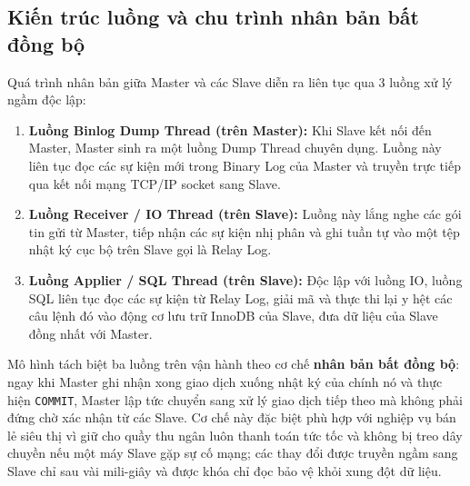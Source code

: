 \documentclass[12pt,a4paper]{report}
\begin{document}
\subsection{Kiến trúc luồng và chu trình nhân bản bất đồng bộ}
Quá trình nhân bản giữa Master và các Slave diễn ra liên tục qua 3 luồng xử lý ngầm độc lập:
\begin{enumerate}
    \item \textbf{Luồng Binlog Dump Thread (trên Master):} Khi Slave kết nối đến Master, Master sinh ra một luồng Dump Thread chuyên dụng. Luồng này liên tục đọc các sự kiện mới trong Binary Log của Master và truyền trực tiếp qua kết nối mạng TCP/IP socket sang Slave.
    \item \textbf{Luồng Receiver / IO Thread (trên Slave):} Luồng này lắng nghe các gói tin gửi từ Master, tiếp nhận các sự kiện nhị phân và ghi tuần tự vào một tệp nhật ký cục bộ trên Slave gọi là Relay Log.
    \item \textbf{Luồng Applier / SQL Thread (trên Slave):} Độc lập với luồng IO, luồng SQL liên tục đọc các sự kiện từ Relay Log, giải mã và thực thi lại y hệt các câu lệnh đó vào động cơ lưu trữ InnoDB của Slave, đưa dữ liệu của Slave đồng nhất với Master.
\end{enumerate}

Mô hình tách biệt ba luồng trên vận hành theo cơ chế \textbf{nhân bản bất đồng bộ}: ngay khi Master ghi nhận xong giao dịch xuống nhật ký của chính nó và thực hiện \texttt{COMMIT}, Master lập tức chuyển sang xử lý giao dịch tiếp theo mà không phải đứng chờ xác nhận từ các Slave. Cơ chế này đặc biệt phù hợp với nghiệp vụ bán lẻ siêu thị vì giữ cho quầy thu ngân luôn thanh toán tức tốc và không bị treo dây chuyền nếu một máy Slave gặp sự cố mạng; các thay đổi được truyền ngầm sang Slave chỉ sau vài mili-giây và được khóa chỉ đọc bảo vệ khỏi xung đột dữ liệu.
\end{document}
